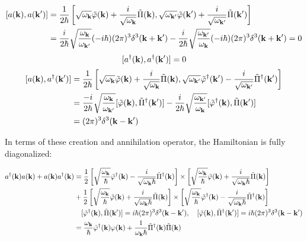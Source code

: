 \[\begin{split}
[a({\bf k}),a({\bf k'})] &= \frac{1}{2\hbar} \left[\sqrt{\omega_{\bf k}}\tilde\varphi({\bf k}) + \frac{i}{\sqrt{\omega_{\bf k}}}\tilde\Pi({\bf k}),\sqrt{\omega_{\bf k'}}\tilde\varphi({\bf k'}) + \frac{i}{\sqrt{\omega_{\bf k'}}}\tilde\Pi({\bf k'}) \right]\\
&=\frac{i}{2\hbar}\sqrt{\frac{{\omega_{\bf k}}}{{\omega_{\bf k'}}}}(-i\hbar)(2\pi)^3\delta^3({\bf k+k'}) - \frac{i}{2\hbar}\sqrt{\frac{{\omega_{\bf k'}}}{{\omega_{\bf k}}}}(-i\hbar)(2\pi)^3\delta^3({\bf k+k'}) = 0
\end{split}\]
\[[a^\dagger({\bf k}),a^\dagger({\bf k'})] = 0 \]
\[\begin{split}
[a({\bf k}),a^\dagger({\bf k'})]&= \frac{1}{2\hbar} \left[\sqrt{\omega_{\bf k}}\tilde\varphi({\bf k}) + \frac{i}{\sqrt{\omega_{\bf k}}}\tilde\Pi({\bf k}),\sqrt{\omega_{\bf k'}}\tilde\varphi^\dagger({\bf k'}) - \frac{i}{\sqrt{\omega_{\bf k'}}}\tilde\Pi^\dagger({\bf k'}) \right]\\
&=\frac{-i}{2\hbar}\sqrt{\frac{{\omega_{\bf k}}}{{\omega_{\bf k'}}}}[\tilde{\varphi}({\bf k}),\tilde{\Pi}^\dagger({\bf k'})] - \frac{i}{2\hbar}\sqrt{\frac{{\omega_{\bf k'}}}{{\omega_{\bf k}}}}[\tilde{\varphi}^\dagger({\bf k}),\tilde{\Pi}({\bf k'})]\\
&=(2\pi)^3\delta^3({\bf k-k'})
\end{split} \]

In terms of these creation and annihilation operator, the Hamiltonian is fully diagonalized: 

\[\begin{split}
a^\dagger({\bf k})a({\bf k}) + a({\bf k})a^\dagger({\bf k})
&= \frac{1}{2}\left[\sqrt{\frac{\omega_{\bf k}}{\hbar}}\tilde\varphi^\dagger({\bf k}) - \frac{i}{\sqrt{\omega_{\bf k}\hbar}}\tilde\Pi^\dagger({\bf k})\right]\times\left[\sqrt{\frac{\omega_{\bf k}}{\hbar}}\tilde\varphi({\bf k}) + \frac{i}{\sqrt{\omega_{\bf k}\hbar}}\tilde\Pi({\bf k})\right]\\
& +\frac{1}{2}\left[\sqrt{\frac{\omega_{\bf k}}{\hbar}}\tilde\varphi({\bf k}) + \frac{i}{\sqrt{\omega_{\bf k}\hbar}}\tilde\Pi({\bf k})\right]\times\left[\sqrt{\frac{\omega_{\bf k}}{\hbar}}\tilde\varphi^\dagger({\bf k}) - \frac{i}{\sqrt{\omega_{\bf k}\hbar}}\tilde\Pi^\dagger({\bf k})\right]\\
&\quad [\tilde\varphi^\dagger({\bf k}),\tilde\Pi({\bf k'})] = i\hbar(2\pi)^3\delta^3({\bf k-k'}),\quad [\tilde\varphi({\bf k}),\tilde\Pi^\dagger({\bf k'})] = i\hbar(2\pi)^3\delta^3({\bf k-k'})\\
&=\frac{\omega_{\bf k}}{\hbar}\tilde\varphi^\dagger({\bf k})\varphi({\bf k}) + \frac{1}{\omega_{\bf k}\hbar}\tilde\Pi^\dagger({\bf k})\tilde\Pi({\bf k})
\end{split}\]

